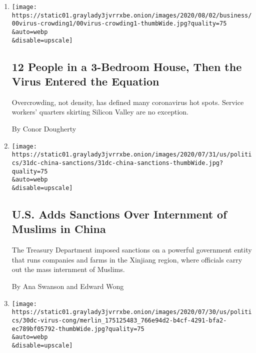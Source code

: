 \begin{enumerate}
\def\labelenumi{\arabic{enumi}.}
\item
  \href{/2020/08/01/business/economy/housing-overcrowding-coronavirus.html}{}

  \texttt{[image: https://static01.graylady3jvrrxbe.onion/images/2020/08/02/business/00virus-crowding1/00virus-crowding1-thumbWide.jpg?quality=75\\\&auto=webp\\\&disable=upscale]}

  \hypertarget{12-people-in-a-3-bedroom-house-then-the-virus-entered-the-equation}{%
  \subsection{12 People in a 3-Bedroom House, Then the Virus Entered the
  Equation}\label{12-people-in-a-3-bedroom-house-then-the-virus-entered-the-equation}}

  Overcrowding, not density, has defined many coronavirus hot spots.
  Service workers' quarters skirting Silicon Valley are no exception.

  By Conor Dougherty
\item
  \href{/2020/07/31/us/politics/sanctions-china-xinjiang-uighurs.html}{}

  \texttt{[image: https://static01.graylady3jvrrxbe.onion/images/2020/07/31/us/politics/31dc-china-sanctions/31dc-china-sanctions-thumbWide.jpg?quality=75\\\&auto=webp\\\&disable=upscale]}

  \hypertarget{us-adds-sanctions-over-internment-of-muslims-in-china}{%
  \subsection{U.S. Adds Sanctions Over Internment of Muslims in
  China}\label{us-adds-sanctions-over-internment-of-muslims-in-china}}

  The Treasury Department imposed sanctions on a powerful government
  entity that runs companies and farms in the Xinjiang region, where
  officials carry out the mass internment of Muslims.

  By Ana Swanson and Edward Wong
\item
  \href{/2020/07/30/us/politics/senate-virus-aid.html}{}

  \texttt{[image: https://static01.graylady3jvrrxbe.onion/images/2020/07/30/us/politics/30dc-virus-cong/merlin\_175125483\_766e94d2-b4cf-4291-bfa2-ec789bf05792-thumbWide.jpg?quality=75\\\&auto=webp\\\&disable=upscale]}

  \hypertarget{with-jobless-aid-set-to-lapse-lawmakers-fail-to-agree-on-extension}{%
}
\end{enumerate}
